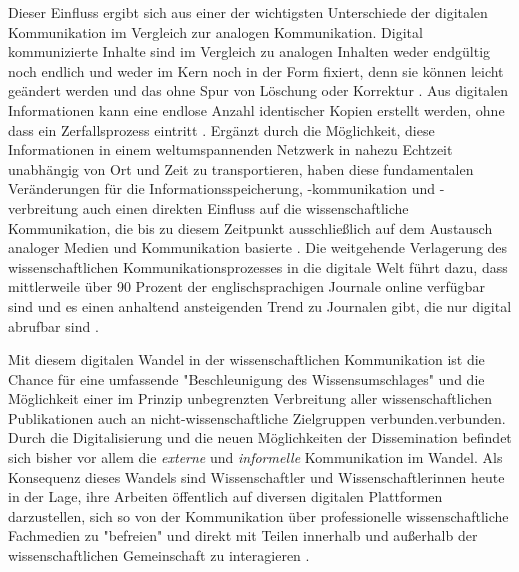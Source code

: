 Dieser Einfluss ergibt sich aus einer der wichtigsten Unterschiede der digitalen Kommunikation im Vergleich zur analogen Kommunikation. Digital kommunizierte Inhalte sind im Vergleich zu analogen Inhalten weder endgültig noch endlich und weder im Kern noch in der Form fixiert, denn sie können leicht geändert werden und das ohne Spur von Löschung oder Korrektur \cite{Smith_1999a}. Aus digitalen Informationen kann eine endlose Anzahl identischer Kopien erstellt werden, ohne dass ein Zerfallsprozess eintritt \cite{Smith_1999a}. Ergänzt durch die Möglichkeit, diese Informationen in einem weltumspannenden Netzwerk in nahezu Echtzeit unabhängig von Ort und Zeit zu transportieren, haben diese fundamentalen Veränderungen für die Informationsspeicherung, -kommunikation und -verbreitung auch einen direkten Einfluss auf die wissenschaftliche Kommunikation, die bis zu diesem Zeitpunkt ausschließlich auf dem Austausch analoger Medien und Kommunikation basierte \cite{Seidenfaden_2005}. Die weitgehende Verlagerung des wissenschaftlichen Kommunikationsprozesses in die digitale Welt führt dazu, dass mittlerweile über 90 Prozent der englischsprachigen Journale online verfügbar sind und es einen anhaltend ansteigenden Trend zu Journalen gibt, die nur digital abrufbar sind \cite{Cope_2014} \cite[:233]{Gould_2009} \cite{Willinsky_2006}.

Mit diesem digitalen Wandel in der wissenschaftlichen Kommunikation ist die Chance für eine umfassende "Beschleunigung des Wissensumschlages" \cite{Wenzel_2003} und die Möglichkeit einer im Prinzip unbegrenzten Verbreitung aller wissenschaftlichen Publikationen \cite[:11]{BBAW_2015} \cite{Yiotis_2005} auch an nicht-wissenschaftliche Zielgruppen \cite{Konneker_2013} verbunden.verbunden. Durch die Digitalisierung und die neuen Möglichkeiten der Dissemination befindet sich bisher vor allem die \textit{externe} und \textit{informelle} Kommunikation im Wandel. Als Konsequenz dieses Wandels sind Wissenschaftler und Wissenschaftlerinnen heute in der Lage, ihre Arbeiten öffentlich auf diversen digitalen Plattformen darzustellen, sich so von der Kommunikation über professionelle wissenschaftliche Fachmedien zu "befreien" und direkt mit Teilen innerhalb und außerhalb der wissenschaftlichen Gemeinschaft zu interagieren \cite{Konneker_2013}.

